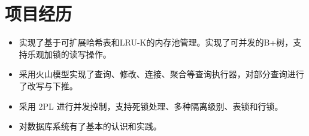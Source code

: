 \documentclass{resume}
\begin{document}
\section{项目经历}

\begin{itemize}
  \item 实现了基于可扩展哈希表和LRU-K的内存池管理。实现了可并发的B+树，支持乐观加锁的读写操作。
  \item 采用火山模型实现了查询、修改、连接、聚合等查询执行器，对部分查询进行了改写与下推。
  \item 采用 2PL 进行并发控制，支持死锁处理、多种隔离级别、表锁和行锁。
  \item 对数据库系统有了基本的认识和实践。
\end{itemize}






\end{document}
